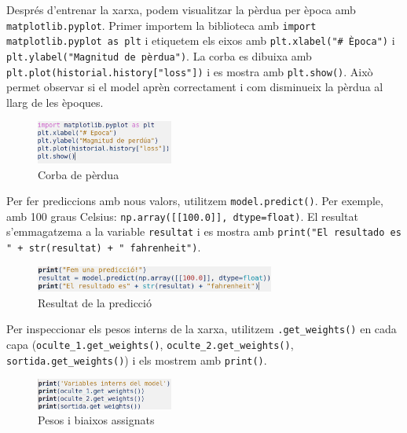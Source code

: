 Després d’entrenar la xarxa, podem visualitzar la pèrdua per època amb \texttt{matplotlib.pyplot}. Primer importem la biblioteca amb \texttt{import matplotlib.pyplot as plt} i etiquetem els eixos amb \texttt{plt.xlabel("\# Època")} i \texttt{plt.ylabel("Magnitud de pèrdua")}. La corba es dibuixa amb \texttt{plt.plot(historial.history["loss"])} i es mostra amb \texttt{plt.show()}. Això permet observar si el model aprèn correctament i com disminueix la pèrdua al llarg de les èpoques.

\begin{figure}[H]

\centering

\includegraphics[width=0.4\textwidth]{./figures/7.png}

\caption{Corba de pèrdua}

\end{figure}

Per fer prediccions amb nous valors, utilitzem \texttt{model.predict()}. Per exemple, amb 100 graus Celsius: \texttt{np.array([[100.0]], dtype=float)}. El resultat s’emmagatzema a la variable \texttt{resultat} i es mostra amb \texttt{print("El resultado es " + str(resultat) + " fahrenheit")}.

\begin{figure}[H]

\centering

\includegraphics[width=0.7\textwidth]{./figures/8.png}

\caption{Resultat de la predicció}

\end{figure}

Per inspeccionar els pesos interns de la xarxa, utilitzem \texttt{.get\_weights()} en cada capa (\texttt{oculte\_1.get\_weights()}, \texttt{oculte\_2.get\_weights()}, \texttt{sortida.get\_weights()}) i els mostrem amb \texttt{print()}.

\begin{figure}[H]

\centering

\includegraphics[width=0.4\textwidth]{./figures/9.png}

\caption{Pesos i biaixos assignats}

\end{figure}

